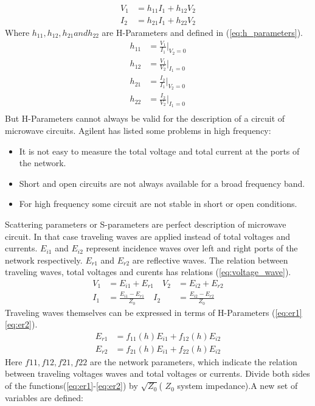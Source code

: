 \begin{align}
V_{1}&=h_{11}I_{1}+h_{12}V_{2}\\
I_{2}&=h_{21}I_{1}+h_{22}V_{2}
\label{eq:voltage_current}
\end{align}
Where $h_{11},h_{12},h_{21} and h_{22}$ are H-Parameters and defined in (\ref{eq:h_parameters}).
\begin{align}
h_{11}&=\frac{V_{1}}{I_{1}}|_{V_{2}=0}\\
h_{12}&=\frac{V_{1}}{V_{2}}|_{I_{1}=0}\\
h_{21}&=\frac{I_{2}}{I_{1}}|_{V_{2}=0}\\
h_{22}&=\frac{I_{2}}{V_{2}}|_{I_{1}=0}\\
\label{eq:h_parameters}
\end{align}
But H-Parameters cannot always be valid for the description of a circuit of microwave circuits. Agilent\cite{aglient_s_parameters} has listed some problems in high frequency:
\begin{itemize}
\item It is not easy to measure the total voltage and total current at the ports of the network.
\item Short and open circuits are not always available for a broad frequency band.
\item For high frequency some circuit are not stable in short or open conditions.
\end{itemize}
Scattering parameters or S-parameters are perfect description of microwave circuit\cite{RF194_s_parameters}. In that case traveling waves are applied instead of total voltages and currents. $E_{i1}$ and $E_{i2}$ represent incidence waves over left and right ports of the network respectively. $E_{r1}$ and $E_{r2}$ are reflective waves. The relation between traveling waves, total voltages and curents has relations (\ref{eq:voltage_wave}).
\begin{align}
V_{1}&=E_{i1}+E_{r1}\quad V_{2}&=E_{i2}+E_{r2}\\
I_{1}&=\frac{E_{i1}-E_{r1}}{Z_{0}}\quad I_{2}&=\frac{E_{i2}-E_{r2}}{Z_{0}}
\label{eq:voltage_wave}
\end{align}
Traveling waves themselves can be expressed in terms of H-Parameters (\ref{eq:er1}\ref{eq:er2}). 
\begin{align}
E_{r1}&=f_{11}(h)E_{i1}+f_{12}(h)E_{i2}
\label{eq:er1}
\\
E_{r2}&=f_{21}(h)E_{i1}+f_{22}(h)E_{i2}
\label{eq:er2}
\end{align}
Here $f11, f12, f21, f22$ are the network parameters, which indicate the relation between traveling voltages waves and total voltages or currents. Divide both sides of the functions(\ref{eq:er1}-\ref{eq:er2}) by $\sqrt{Z_{0}}$( $Z_{0}$ system impedance).A new set of variables are defined:
